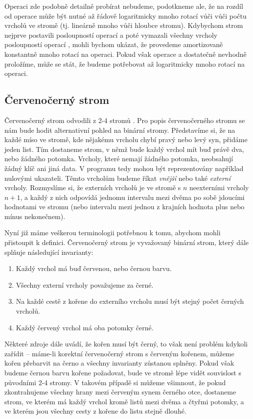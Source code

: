 Operaci  zde podobně detailně probírat nebudeme, podotkneme ale, že na rozdíl od operace  může být nutné až řádově logaritmicky mnoho rotací vůči vůči počtu vrcholů ve stromě (tj. lineárně mnoho vůči hloubce stromu). Kdybychom strom nejprve postavili posloupností operací  a poté vymazali všechny vrcholy posloupností operací , mohli bychom ukázat, že provedeme amortizovaně konstantně mnoho rotací na operaci. Pokud však operace  a  dostatečně nevhodně proložíme, může se stát, že budeme potřebovat až logaritmicky mnoho rotací na operaci.



\subsection{Červenočerný strom}\label{sec:RB}

Červenočerný strom odvodili z 2-4 stromů \citet{redblack}. Pro popis
červenočerného stromu se nám bude hodit alternativní pohled na binární stromy.
Představíme si, že na každé míso ve stromě, kde nějakému vrcholu chybí pravý nebo levý syn, přidáme jeden list.
Tím dostaneme strom, v němž bude každý vrchol mít buď právě dva, nebo
žádného potomka. Vrcholy, které nemají žádného potomka, neobsahují žádný klíč
ani jiná data. V programu tedy mohou být reprezentovány například nulovými
ukazateli. Těmto vrcholům budeme říkat \emph{vnější} nebo také \emph{externí}
vrcholy. Rozmyslíme si, že externích vrcholů je ve stromě s $n$ neexterními vrcholy $n+1$, a každý z nich odpovídá jednomu intervalu mezi dvěma po sobě jdoucími hodnotami ve stromu (nebo intervalu mezi jednou z krajních hodnota  plus nebo mínus nekonečnem).

Nyní již máme veškerou terminologii potřebnou k tomu, abychom mohli přistoupit k definici. Červenočerný strom je vyvažovaný binární strom, který dále splňuje následující invarianty:

\begin{enumerate}
\item Každý vrchol má buď červenou, nebo černou barvu.
\item Všechny externí vrcholy považujeme za černé.
\item Na každé cestě z kořene do externího vrcholu musí být stejný počet černých vrcholů.
\item Každý červený vrchol má oba potomky černé.
\end{enumerate}

Některé zdroje dále uvádí, že kořen musí být černý, to však není problém kdykoli zařídit -- máme-li korektní červenočerný strom s červeným kořenem, můžeme kořen přebarvit na černo a všechny invarianty zůstanou splněny. Pokud však budeme černou barvu kořene požadovat, bude ve stromě lépe vidět souvislost s původními 2-4 stromy. V takovém případě si můžeme všimnout, že pokud zkontrahujeme všechny hrany mezi červeným synem černého otce, dostaneme strom, ve kterém má každý vrchol kromě listů mezi dvěma a čtyřmi potomky, a ve kterém jsou všechny cesty z kořene do listu stejně dlouhé.

